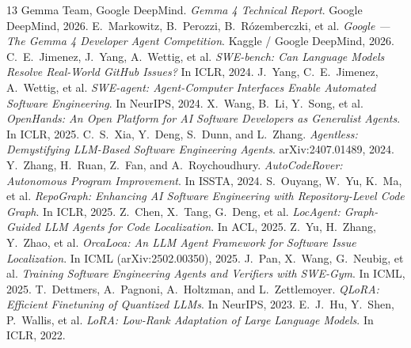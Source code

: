 \documentclass[10pt,twocolumn,letterpaper]{article}
\begin{document}
\begin{thebibliography}{13}\scriptsize
\setlength{\itemsep}{-0.6pt}
\setlength{\parskip}{0pt}
 Gemma Team, Google DeepMind. \emph{Gemma 4 Technical Report}. Google DeepMind, 2026.
 E.\ Markowitz, B.\ Perozzi, B.\ R\'ozemberczki, et al. \emph{Google --- The Gemma 4 Developer Agent Competition}. Kaggle / Google DeepMind, 2026.
 C.\ E.\ Jimenez, J.\ Yang, A.\ Wettig, et al. \emph{SWE-bench: Can Language Models Resolve Real-World GitHub Issues?} In ICLR, 2024.
 J.\ Yang, C.\ E.\ Jimenez, A.\ Wettig, et al. \emph{SWE-agent: Agent-Computer Interfaces Enable Automated Software Engineering}. In NeurIPS, 2024.
 X.\ Wang, B.\ Li, Y.\ Song, et al. \emph{OpenHands: An Open Platform for AI Software Developers as Generalist Agents}. In ICLR, 2025.
 C.\ S.\ Xia, Y.\ Deng, S.\ Dunn, and L.\ Zhang. \emph{Agentless: Demystifying LLM-Based Software Engineering Agents}. arXiv:2407.01489, 2024.
 Y.\ Zhang, H.\ Ruan, Z.\ Fan, and A.\ Roychoudhury. \emph{AutoCodeRover: Autonomous Program Improvement}. In ISSTA, 2024.
 S.\ Ouyang, W.\ Yu, K.\ Ma, et al. \emph{RepoGraph: Enhancing AI Software Engineering with Repository-Level Code Graph}. In ICLR, 2025.
 Z.\ Chen, X.\ Tang, G.\ Deng, et al. \emph{LocAgent: Graph-Guided LLM Agents for Code Localization}. In ACL, 2025.
 Z.\ Yu, H.\ Zhang, Y.\ Zhao, et al. \emph{OrcaLoca: An LLM Agent Framework for Software Issue Localization}. In ICML (arXiv:2502.00350), 2025.
 J.\ Pan, X.\ Wang, G.\ Neubig, et al. \emph{Training Software Engineering Agents and Verifiers with SWE-Gym}. In ICML, 2025.
 T.\ Dettmers, A.\ Pagnoni, A.\ Holtzman, and L.\ Zettlemoyer. \emph{QLoRA: Efficient Finetuning of Quantized LLMs}. In NeurIPS, 2023.
 E.\ J.\ Hu, Y.\ Shen, P.\ Wallis, et al. \emph{LoRA: Low-Rank Adaptation of Large Language Models}. In ICLR, 2022.
\end{thebibliography}
\end{document}
